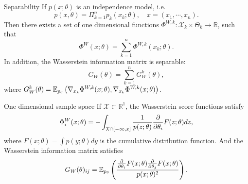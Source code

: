 \documentclass{beamer}
\begin{document}
\begin{frame}{Separability}
If $p(x;\theta)$ is an independence model, i.e. 
\begin{equation*}
    p(x,\theta) = \Pi_{k = 1}^n p_k(x_k;\theta),\quad x=(x_1,\cdots, x_n).
\end{equation*}
Then there exists a set of one dimensional functions $\Phi^{W,k}\colon \mathcal{X}_k \times\Theta_k\rightarrow \mathbb{R}$, such that 
\begin{equation*}\label{linear}
\Phi^W(x;\theta)=\sum_{k = 1}^n\Phi^{W,k}(x_k;\theta).
\end{equation*}
In addition, the Wasserstein information matrix is separable:
\begin{equation*}
G_W(\theta)=\sum_{k = 1}^nG_{W}^k(\theta),
\end{equation*}
where $G_{W}^k(\theta)=\mathbb{E}_{p_\theta} \left( \nabla_{x_k}\Phi^{W,k}(x;\theta), \nabla_{x_k}\Phi^{W,k}(x;\theta) \right) $.
\end{frame}

\begin{frame}{One dimensional sample space}
If $\mathcal{X}\subset \mathbb{R}^1$, the Wasserstein score functions satisfy
\begin{equation*}\label{1d}
\Phi_i^W(x;\theta)=-\int_{\mathcal{X} \cap \left[ -\infty, x \right]} \frac{1}{p(z;\theta)}\frac{\partial}{\partial\theta_i}F(z;\theta)dz, 
\end{equation*}
 where $F(x;\theta)=\int p(y;\theta)dy$ is the cumulative distribution function. And the Wasserstein information matrix satisfies 
 \begin{equation*}
 G_W(\theta)_{ij}=\mathbb{E}_{p_\theta} \left( \frac{\frac{\partial}{\partial\theta_i}F(x;\theta)\frac{\partial}{\partial\theta_j}F(x;\theta)}{p(x;\theta)^2} \right).
 \end{equation*}
\end{frame}
\end{document}
